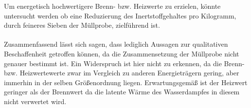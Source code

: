 Um energetisch hochwertigere Brenn- bzw. Heizwerte zu erzielen, könnte untersucht werden ob eine Reduzierung des Inertstoffgehaltes pro Kilogramm, durch feineres Sieben der Müllprobe, zielführend ist.\\ \\
Zusammenfassend lässt sich sagen, dass lediglich Aussagen zur qualitativen Beschaffenheit getroffen können, da die Zusammensetzung der Müllprobe nicht genauer bestimmt ist. Ein Widerspruch ist hier nicht zu erkennen, da die Brenn- bzw. Heizwertewerte zwar im Vergleich zu anderen Energieträgern gering, aber immerhin in der selben Größenordnung liegen.\linebreak
Erwartungsgemäß ist der Heizwert geringer als der Brennwert da die latente Wärme des Wasserdampfes in diesem nicht verwertet wird.\\

